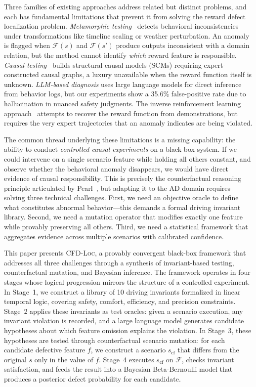 \documentclass[journal]{IEEEtran}
\theoremstyle{plain}
\newcommand{\methodname}{\textsc{CFD-Loc}}
\newcommand{\sys}{\mathcal{F}}
\begin{document}
Three families of existing approaches address related but distinct problems, and each has fundamental limitations that prevent it from solving the reward defect localization problem. \emph{Metamorphic testing}~\cite{deng2023rmt} detects behavioral inconsistencies under transformations like timeline scaling or weather perturbation. An anomaly is flagged when $\sys(s)$ and $\sys(s')$ produce outputs inconsistent with a domain relation, but the method cannot identify \emph{which} reward feature is responsible. \emph{Causal testing}~\cite{zhao2023causal} builds structural causal models (SCMs) requiring expert-constructed causal graphs, a luxury unavailable when the reward function itself is unknown. \emph{LLM-based diagnosis} uses large language models for direct inference from behavior logs, but our experiments show a 35.6\% false-positive rate due to hallucination in nuanced safety judgments. The inverse reinforcement learning approach~\cite{ng2000policy} attempts to recover the reward function from demonstrations, but requires the very expert trajectories that an anomaly indicates are being violated.

The common thread underlying these limitations is a missing capability: the ability to conduct \emph{controlled causal experiments} on a black-box system. If we could intervene on a single scenario feature while holding all others constant, and observe whether the behavioral anomaly disappears, we would have direct evidence of causal responsibility. This is precisely the counterfactual reasoning principle articulated by Pearl~\cite{pearl2019probabilistic}, but adapting it to the AD domain requires solving three technical challenges. First, we need an objective oracle to define what constitutes abnormal behavior---this demands a formal driving invariant library. Second, we need a mutation operator that modifies exactly one feature while provably preserving all others. Third, we need a statistical framework that aggregates evidence across multiple scenarios with calibrated confidence.

This paper presents \methodname, a provably convergent black-box framework that addresses all three challenges through a synthesis of invariant-based testing, counterfactual mutation, and Bayesian inference. The framework operates in four stages whose logical progression mirrors the structure of a controlled experiment. In Stage~1, we construct a library of 10 driving invariants formalized in linear temporal logic, covering safety, comfort, efficiency, and precision constraints. Stage~2 applies these invariants as test oracles: given a scenario execution, any invariant violation is recorded, and a large language model generates candidate hypotheses about which feature omission explains the violation. In Stage~3, these hypotheses are tested through counterfactual scenario mutation: for each candidate defective feature $f$, we construct a scenario $s_{\text{cf}}$ that differs from the original $s$ only in the value of $f$. Stage~4 executes $s_{\text{cf}}$ on $\sys$, checks invariant satisfaction, and feeds the result into a Bayesian Beta-Bernoulli model that produces a posterior defect probability for each candidate.
\end{document}
